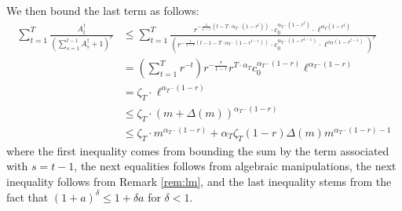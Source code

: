 \documentclass[nonblindrev]{informs3noheader}
\begin{document}
We then bound the last term as follows:
\begin{align*}
    \sum_{t=1}^T \frac{A^\dagger_t}{\left(\sum_{s=1}^{t-1} A^\dagger_s +1\right)^r}
    &\leq \sum_{t=1}^T \frac{r^{-\frac{1}{1-r}\left(t-T\cdot\alpha_T\cdot(1-r^t)\right)}\cdot c_0^{\alpha_T\cdot(1-r^t)}\cdot \ell^{\alpha_T(1-r^t)}}{\left(r^{-\frac{1}{1-r}\left(t-1-T\cdot\alpha_T\cdot(1-r^{t-1})\right)}\cdot c_0^{\alpha_T\cdot(1-r^{t-1})}\cdot \ell^{\alpha_T(1-r^{t-1})}\right)^r}\\
    &= \left(\sum_{t=1}^T r^{-t}\right)r^{-\frac{r}{1-r}}r^{T\cdot \alpha_T}c_0^{\alpha_T\cdot (1-r)}\ell^{\alpha_T\cdot (1-r)}\\
    &= \zeta_T\cdot\ell^{\alpha_T\cdot (1-r)}\\
    &\leq \zeta_T \cdot \left(m+ \Delta(m)\right)^{\alpha_T\cdot (1-r)}
    \\&\leq  \zeta_T \cdot m^{\alpha_T \cdot (1-r)} +  \alpha_T\zeta_T(1-r) \Delta(m)m^{\alpha_T \cdot (1-r)-1}
\end{align*}
where the first inequality comes from bounding the sum by the term associated with $s=t-1$, the next equalities follows from algebraic manipulations, the next inequality follows from Remark \ref{rem:lm}, and the last inequality stems from the fact that $(1+a)^\delta\leq1+\delta a$ for $\delta<1$.
\end{document}
